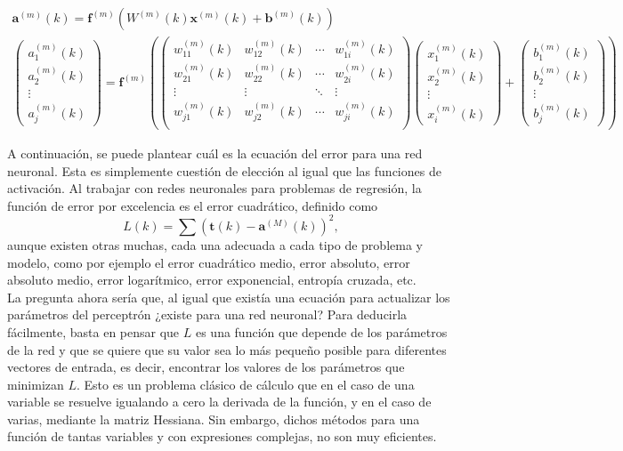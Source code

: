 		\begin{equation}
			\label{eq:prop}
			\begin{gathered}
				\textbf{a}^{(m)}(k) = \textbf{f}^{(m)}\left(W^{(m)}(k)\textbf{x}^{(m)}(k) + \textbf{b}^{(m)}(k)\right)\\
				\begin{pmatrix}
					a_1^{(m)}(k)\\a_2^{(m)}(k)\\\vdots\\a_j^{(m)}(k)
				\end{pmatrix} = \textbf{f}^{(m)}\left(
				\begin{pmatrix}
					w_{11}^{(m)}(k) & w_{12}^{(m)}(k) & \cdots & w_{1i}^{(m)}(k)\\
					w_{21}^{(m)}(k) & w_{22}^{(m)}(k) & \cdots & w_{2i}^{(m)}(k)\\
					\vdots & \vdots & \ddots & \vdots\\
					w_{j1}^{(m)}(k) & w_{j2}^{(m)}(k) & \cdots & w_{ji}^{(m)}(k)\\
				\end{pmatrix}
				\begin{pmatrix}
					x_1^{(m)}(k)\\x_2^{(m)}(k)\\\vdots\\x_i^{(m)}(k)
				\end{pmatrix} + 
				\begin{pmatrix}
					b_1^{(m)}(k)\\b_2^{(m)}(k)\\\vdots\\b_j^{(m)}(k)
				\end{pmatrix}\right)
			\end{gathered}
		\end{equation}
		
		A continuación, se puede plantear cuál es la ecuación del error para una red neuronal. Esta es simplemente cuestión de elección al igual que las funciones de activación. Al trabajar con redes neuronales para problemas de regresión, la función de error por excelencia es el error cuadrático, definido como
		$$
		L(k) = \sum(\textbf{t}(k) - \textbf{a}^{(M)}(k))^2, 
		$$
		aunque existen otras muchas, cada una adecuada a cada tipo de problema y modelo, como por ejemplo el error cuadrático medio, error absoluto, error absoluto medio, error logarítmico, error exponencial, entropía cruzada, etc\cite{funcionesError}.\\
		
		La pregunta ahora sería que, al igual que existía una ecuación para actualizar los parámetros del perceptrón ¿existe para una red neuronal? Para deducirla fácilmente, basta en pensar que $L$ es una función que depende de los parámetros de la red y que se quiere que su valor sea lo más pequeño posible para diferentes vectores de entrada, es decir, encontrar los valores de los parámetros que minimizan $L$. Esto es un problema clásico de cálculo que en el caso de una variable se resuelve igualando a cero la derivada de la función, y en el caso de varias, mediante la matriz Hessiana. Sin embargo, dichos métodos para una función de tantas variables y con expresiones complejas, no son muy eficientes. \\
		
